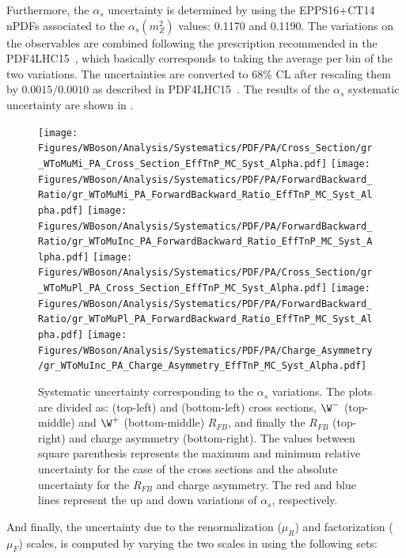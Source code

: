 \clearpage
Furthermore, the $\alpha_{s}$ uncertainty is determined by using the EPPS16+CT14 nPDFs associated to the $\alpha_{s}\left(m_{Z}^{2}\right)$ values: 0.1170 and 0.1190. The variations on the observables are combined following the prescription recommended in the PDF4LHC15~\cite{PDF4LHC}, which basically corresponds to taking the average per bin of the two variations. The uncertainties are converted to 68$\%$ CL after rescaling them by $0.0015/0.0010$ as described in PDF4LHC15~\cite{PDF4LHC}. The results of the $\alpha_{s}$ systematic uncertainty are shown in .

\begin{figure}[!htbp]
 \begin{center}
  \texttt{[image: Figures/WBoson/Analysis/Systematics/PDF/PA/Cross\_Section/gr\_WToMuMi\_PA\_Cross\_Section\_EffTnP\_MC\_Syst\_Alpha.pdf]}
  \texttt{[image: Figures/WBoson/Analysis/Systematics/PDF/PA/ForwardBackward\_Ratio/gr\_WToMuMi\_PA\_ForwardBackward\_Ratio\_EffTnP\_MC\_Syst\_Alpha.pdf]}
  \texttt{[image: Figures/WBoson/Analysis/Systematics/PDF/PA/ForwardBackward\_Ratio/gr\_WToMuInc\_PA\_ForwardBackward\_Ratio\_EffTnP\_MC\_Syst\_Alpha.pdf]}
  \texttt{[image: Figures/WBoson/Analysis/Systematics/PDF/PA/Cross\_Section/gr\_WToMuPl\_PA\_Cross\_Section\_EffTnP\_MC\_Syst\_Alpha.pdf]}
  \texttt{[image: Figures/WBoson/Analysis/Systematics/PDF/PA/ForwardBackward\_Ratio/gr\_WToMuPl\_PA\_ForwardBackward\_Ratio\_EffTnP\_MC\_Syst\_Alpha.pdf]}
  \texttt{[image: Figures/WBoson/Analysis/Systematics/PDF/PA/Charge\_Asymmetry/gr\_WToMuInc\_PA\_Charge\_Asymmetry\_EffTnP\_MC\_Syst\_Alpha.pdf]}
 \end{center}
 \caption{Systematic uncertainty corresponding to the $\alpha_{s}$ variations. The plots are divided as: \WToMuNuMi (top-left) and \WToMuNuPl (bottom-left) cross sections, $\W^{-}$ (top-middle) and $\W^{+}$ (bottom-middle) $R_{FB}$, and finally the \W $R_{FB}$ (top-right) and \W charge asymmetry (bottom-right). The values between square parenthesis represents the maximum and minimum relative uncertainty for the case of the cross sections and the absolute uncertainty for the $R_{FB}$ and charge asymmetry. The red and blue lines represent the up and down variations of $\alpha_{s}$, respectively.}
 \label{fig:Systematic_MC_Syst_Alpha}
\end{figure}


And finally, the uncertainty due to the renormalization ($\mu_{R}$) and factorization ($\mu_{F}$) scales, is computed by varying the two scales in \POWHEG using the following sets:


